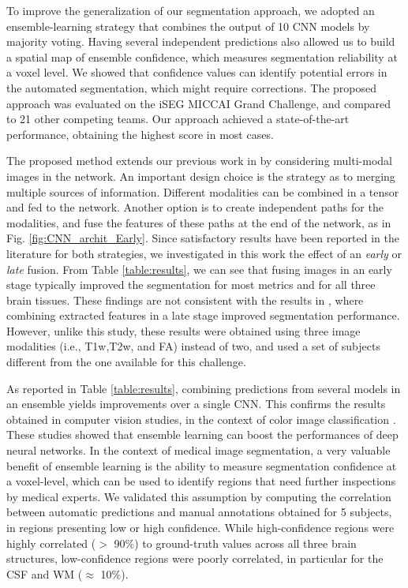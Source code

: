 \documentclass[twoside,espcrc2]{elsarticle}
\begin{document}
To improve the generalization of our segmentation approach, we adopted an ensemble-learning strategy that combines the output of 10 CNN models by majority voting. Having several independent predictions also allowed us to build a spatial map of ensemble confidence, which measures segmentation reliability at a voxel level. We showed that confidence values can identify potential errors in the automated segmentation, which might require corrections. The proposed approach was evaluated on the iSEG MICCAI Grand Challenge, and compared to 21 other competing teams. Our approach achieved a state-of-the-art performance, obtaining the highest score in most cases.

The proposed method extends our previous work in \cite{DolzNeuro2017} by considering multi-modal images in the network. An important design choice is the strategy as to merging multiple sources of information. Different modalities can be combined in a tensor and fed to the network. Another option is to create independent paths for the modalities, and fuse the features of these paths at the end of the network, as in Fig. \ref{fig:CNN_archit_Early}. Since satisfactory results have been reported in the literature for both strategies, we investigated in this work the effect of an \textit{early} or \textit{late} fusion. From Table \ref{table:results}, we can see that fusing images in an early stage typically improved the segmentation for most metrics and for all three brain tissues. These findings are not consistent with the results in \cite{nie2016fully}, where combining extracted features in a late stage improved segmentation performance. However, unlike this study, these results were obtained using three image modalities (i.e., T1w,T2w, and FA) instead of two, and used a set of subjects different from the one available for this challenge.

As reported in Table \ref{table:results}, combining predictions from several models in an ensemble yields improvements over a single CNN. This confirms the results obtained in computer vision studies, in the context of color image classification \cite{krizhevsky2012imagenet,zeiler2014visualizing}. These studies showed that ensemble learning can boost the performances of deep neural networks. 
In the context of medical image segmentation, a very valuable benefit of ensemble learning is the ability to measure segmentation confidence at a voxel-level, which can be used to identify regions that need further inspections by medical experts. We validated this assumption by computing the correlation between automatic predictions and manual annotations obtained for 5 subjects, in regions presenting low or high confidence. While high-confidence regions were highly correlated ($>$ 90$\%$) to ground-truth values across all three brain structures, low-confidence regions were poorly correlated, in particular for the CSF and WM ($\approx$ 10$\%$). 
\end{document}
